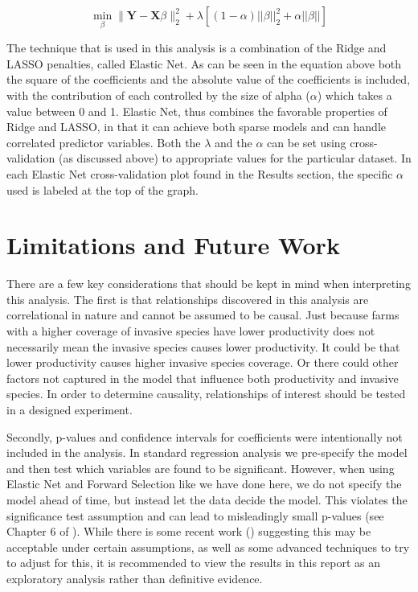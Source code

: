 \documentclass{article}
\newcommand{\bX}{\mathbf{X}}
\newcommand{\bY}{\mathbf{Y}}
\begin{document}
\[\min_{\beta}  \|\bY - \bX\beta\|_{2}^{2} + \lambda[(1 - \alpha)||\beta||_2^2 + \alpha||\beta||] \tag{Elastic Net}\]

The technique that is used in this analysis is a combination of the Ridge and LASSO penalties, called Elastic Net. As can be seen in the equation above both the square of the coefficients and the absolute value of the coefficients is included, with the contribution of each controlled by the size of alpha ($\alpha$) which takes a value between 0 and 1. Elastic Net, thus combines the favorable properties of Ridge and LASSO, in that it can achieve both sparse models and can handle correlated predictor variables. Both the $\lambda$ and the $\alpha$ can be set using cross-validation (as discussed above) to appropriate values for the particular dataset. In each Elastic Net cross-validation plot found in the Results section, the specific $\alpha$ used is labeled at the top of the graph.

\section{Limitations and Future Work}
There are a few key considerations that should be kept in mind when interpreting this analysis. The first is that relationships discovered in this analysis are correlational in nature and cannot be assumed to be causal. Just because farms with a higher coverage of invasive species have lower productivity does not necessarily mean the invasive species causes lower productivity. It could be that lower productivity causes higher invasive species coverage. Or there could other factors not captured in the model that influence both productivity and invasive species. In order to determine causality, relationships of interest should be tested in a designed experiment. 

Secondly, p-values and confidence intervals for coefficients were intentionally not included in the analysis. In standard 
regression analysis we pre-specify the model and then test which variables are found to be significant. However, when using 
Elastic Net and Forward Selection like we have done here, we do not specify the model ahead of time, but instead let the data 
decide the model. This violates the significance test assumption and can lead to misleadingly small p-values (see Chapter 6 of \cite{hastie}). While there is some recent work (\cite{zhao}) suggesting this may be acceptable under certain assumptions, as well as some advanced techniques to try to adjust for this, it is recommended to view the results in this report as an exploratory analysis rather than definitive evidence.
\end{document}
